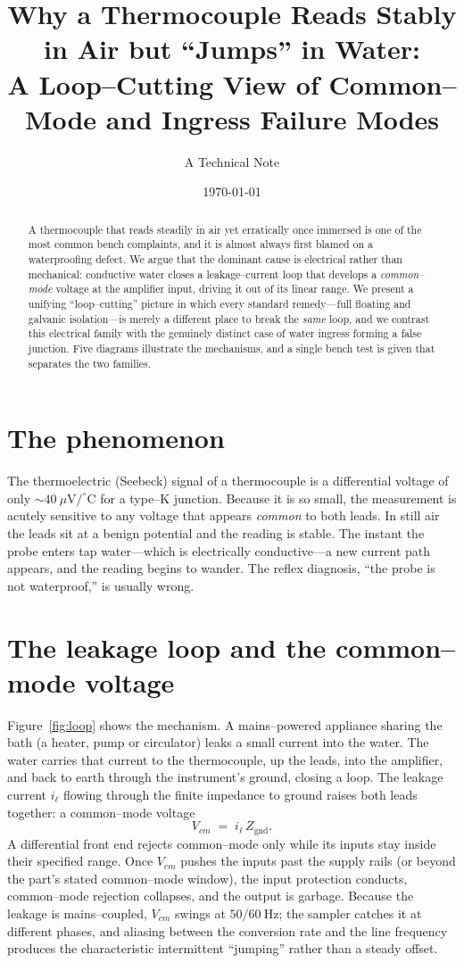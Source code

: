 \documentclass[11pt]{article}
\title{\textbf{Why a Thermocouple Reads Stably in Air but ``Jumps'' in
Water:\\ A Loop--Cutting View of Common--Mode and Ingress Failure Modes}}
\author{A Technical Note}
\date{\today}
\begin{document}
\maketitle

\begin{abstract}
\noindent A thermocouple that reads steadily in air yet erratically once
immersed is one of the most common bench complaints, and it is almost always
first blamed on a waterproofing defect. We argue that the dominant cause is
electrical rather than mechanical: conductive water closes a leakage--current
loop that develops a \emph{common--mode} voltage at the amplifier input,
driving it out of its linear range. We present a unifying ``loop--cutting''
picture in which every standard remedy---full floating and galvanic
isolation---is merely a different place to break the \emph{same} loop, and we
contrast this electrical family with the genuinely distinct case of water
ingress forming a false junction. Five diagrams illustrate the mechanisms, and
a single bench test is given that separates the two families.
\end{abstract}

\section{The phenomenon}
The thermoelectric (Seebeck) signal of a thermocouple is a differential
voltage of only $\sim\!40~\mu\mathrm{V}/^{\circ}\mathrm{C}$ for a type--K
junction. Because it is so small, the measurement is acutely sensitive to any
voltage that appears \emph{common} to both leads. In still air the leads sit
at a benign potential and the reading is stable. The instant the probe enters
tap water---which is electrically conductive---a new current path appears, and
the reading begins to wander. The reflex diagnosis, ``the probe is not
waterproof,'' is usually wrong.

\section{The leakage loop and the common--mode voltage}
Figure~\ref{fig:loop} shows the mechanism. A mains--powered appliance sharing
the bath (a heater, pump or circulator) leaks a small current into the water.
The water carries that current to the thermocouple, up the leads, into the
amplifier, and back to earth through the instrument's ground, closing a loop.
The leakage current $i_{\ell}$ flowing through the finite impedance to ground
raises both leads together: a common--mode voltage
\[
  V_{cm} \;=\; i_{\ell}\,Z_{\mathrm{gnd}} .
\]
A differential front end rejects common--mode only while its inputs stay
inside their specified range. Once $V_{cm}$ pushes the inputs past the supply
rails (or beyond the part's stated common--mode window), the input protection
conducts, common--mode rejection collapses, and the output is garbage.
Because the leakage is mains--coupled, $V_{cm}$ swings at $50/60~\mathrm{Hz}$;
the sampler catches it at different phases, and aliasing between the
conversion rate and the line frequency produces the characteristic
intermittent ``jumping'' rather than a steady offset.
\end{document}

